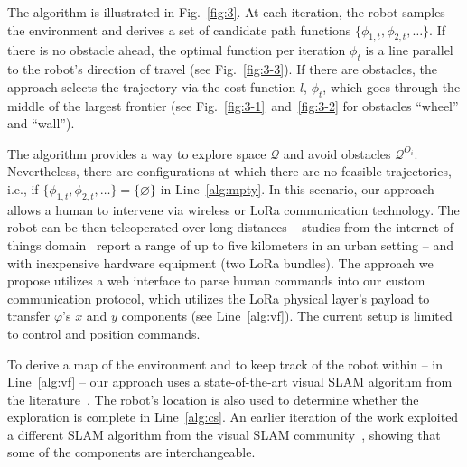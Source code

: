\documentclass[letterpaper,10pt,conference,twoside]{IEEEtran}
\theoremstyle{definition}
\begin{document}
The algorithm is illustrated in Fig.~\ref{fig:3}. At each iteration, the robot samples the environment and derives a set of %
candidate path functions $\{\phi_{1,t},\phi_{2,t},\dots\}$. If there is no obstacle ahead, the optimal function per iteration $\phi_t$ is a line parallel to the robot's direction of travel (see Fig.~\ref{fig:3-3}). If there are obstacles, the %
approach selects the trajectory via the cost function $l$, $\phi_t$, which goes through the middle of the largest frontier (see Fig.~\ref{fig:3-1}~and~\ref{fig:3-2} for %
obstacles ``wheel'' and ``wall'').

The %
algorithm provides a way to explore space $\mathcal{Q}$ and avoid obstacles $\mathcal{Q}^{O_i}$. 
Nevertheless, there are configurations at which there are no feasible trajectories, i.e., if $\{\phi_{1,t},\phi_{2,t},\dots\}=\{\varnothing\}$ in Line~\ref{alg:mpty}. In this scenario, %
our approach allows a human to intervene via %
wireless or LoRa communication technology. The robot can be then teleoperated over long distances -- studies from the internet-of-things domain~\cite{shanmuga2020survey%
} report a range of up to five kilometers in an urban setting -- and with %
inexpensive hardware equipment (two LoRa bundles). The %
approach we propose utilizes a web interface to parse human commands into our custom communication protocol, which utilizes the LoRa physical layer's payload to transfer $\varphi$'s $x$ and $y$ components (see Line~\ref{alg:vf}). The current setup is limited to control and position commands.

To derive a map of the environment and to keep %
track of the robot within -- in Line~\ref{alg:vf} -- our %
approach uses a state-of-the-art visual SLAM algorithm from the literature~\cite{labbe2019rtab}. The robot's location is also used to determine whether the exploration is complete in Line~\ref{alg:cs}. %
An earlier iteration of the work exploited a different SLAM algorithm from the visual SLAM community~\cite{campos2021orb}, showing that some of the %
components are interchangeable.
\end{document}
